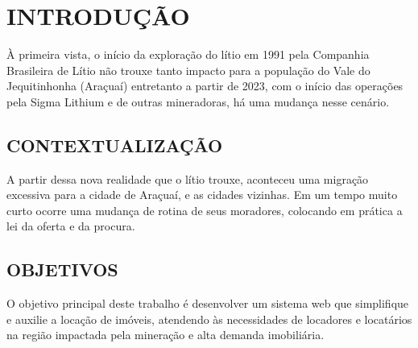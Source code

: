 \chapter{INTRODUÇÃO}


À primeira vista, o início da exploração do lítio em 1991 pela Companhia Brasileira de Lítio não trouxe tanto impacto para a população do Vale do Jequitinhonha (Araçuaí) entretanto a partir de 2023, com o início das operações pela Sigma Lithium e de outras mineradoras, há uma mudança nesse cenário. \cite{preocupacao-exploracao-litio}




\section{CONTEXTUALIZAÇÃO}


 A partir dessa nova realidade que o lítio trouxe, aconteceu uma migração excessiva para a cidade de Araçuaí, e as cidades vizinhas. Em um tempo muito curto ocorre uma mudança de rotina de seus moradores, colocando em prática a lei da oferta e da procura. 

\section{OBJETIVOS}

O objetivo principal deste trabalho é desenvolver um sistema web que simplifique e auxilie a locação de imóveis, atendendo às necessidades de locadores e locatários na região impactada pela mineração e alta demanda imobiliária.



